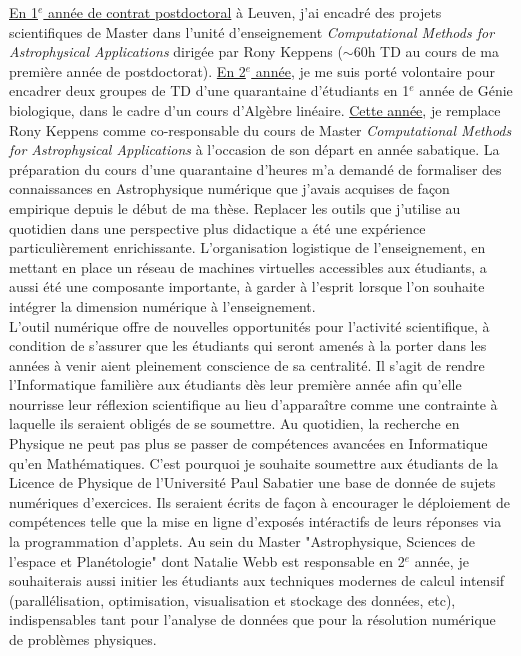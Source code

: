 \documentclass[11pt,onecolumn]{article}
\begin{document}
\indent \underline{En 1$^{e}$ année de contrat postdoctoral} à Leuven, j'ai encadr\'e des projets scientifiques de Master dans l'unit\'e d'enseignement \textit{Computational Methods for Astrophysical Applications} dirig\'ee par Rony Keppens ($\sim$60h TD au cours de ma premi\`ere ann\'ee de postdoctorat). \underline{En 2$^{e}$ année}, je me suis porté volontaire pour encadrer deux groupes de TD d'une quarantaine d'étudiants en 1$^{e}$ année de Génie biologique, dans le cadre d'un cours d'Algèbre linéaire. \underline{Cette année}, je remplace Rony Keppens comme co-responsable du cours de Master \textit{Computational Methods for Astrophysical Applications} à l'occasion de son départ en année sabatique. La préparation du cours d'une quarantaine d'heures m'a demandé de formaliser des connaissances en Astrophysique numérique que j'avais acquises de fa\c con empirique depuis le début de ma thèse. Replacer les outils que j'utilise au quotidien dans une perspective plus didactique a été une expérience particulièrement enrichissante. L'organisation logistique de l'enseignement, en mettant en place un r\'eseau de machines virtuelles accessibles aux \'etudiants, a aussi \'et\'e une composante importante, \`a garder \`a l'esprit lorsque l'on souhaite int\'egrer la dimension num\'erique \`a l'enseignement.\\
\indent L'outil num\'erique offre de nouvelles opportunit\'es pour l'activit\'e scientifique, \`a condition de s'assurer que les \'etudiants qui seront amen\'es \`a la porter dans les ann\'ees \`a venir aient pleinement conscience de sa centralit\'e. Il s'agit de rendre l'Informatique famili\`ere aux \'etudiants d\`es leur premi\`ere ann\'ee afin qu'elle nourrisse leur r\'eflexion scientifique au lieu d'appara\^itre comme une contrainte \`a laquelle ils seraient oblig\'es de se soumettre. Au quotidien, la recherche en Physique ne peut pas plus se passer de comp\'etences avanc\'ees en Informatique qu'en Math\'ematiques. C'est pourquoi je souhaite soumettre aux \'etudiants de la Licence de Physique de l'Université Paul Sabatier une base de donn\'ee de sujets num\'eriques d'exercices. Ils seraient \'ecrits de fa\c con \`a encourager le d\'eploiement de comp\'etences telle que la mise en ligne d'expos\'es int\'eractifs de leurs r\'eponses via la programmation d'applets. Au sein du Master "Astrophysique, Sciences de l'espace et Planétologie" dont Natalie Webb est responsable en 2$^{e}$ année, je souhaiterais aussi initier les \'etudiants aux techniques modernes de calcul intensif (parall\'elisation, optimisation, visualisation et stockage des donn\'ees, etc), indispensables tant pour l'analyse de donn\'ees que pour la r\'esolution num\'erique de probl\`emes physiques. 
\end{document}
